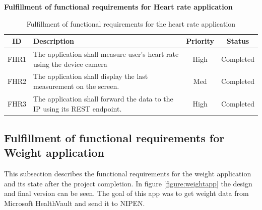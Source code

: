 \textbf{Fulfillment of functional requirements for Heart rate application}

\begin{table}[H]
\begin{center}
\begin{tabular}{ | c | p{9cm} | c | c |}
  \hline
  ID & Description & Priority & Status\\
  \hline\noalign{\smallskip}\noalign{\smallskip}\hline
  FHR1	& The application shall measure user’s heart rate using the device camera    & High & Completed \\
  FHR2	& The application shall display the last measurement on the screen.          & Med & Completed \\
  FHR3	& The application shall forward the data to the IP using its REST endpoint.  & High & Completed \\
  \hline
\end{tabular}
\end{center}
\caption{Fulfillment of functional requirements for the heart rate application}
\label{table:fulfillemntofapp}
\end{table}

\subsection{Fulfillment of functional requirements for Weight application}

This subsection describes the functional requirements for the weight application and its state after the project completion.
In figure \ref{figure:weightapp} the design and final version can be seen.
The goal of this app was to get weight data from Microsoft HealthVault and send it to NIPEN.

